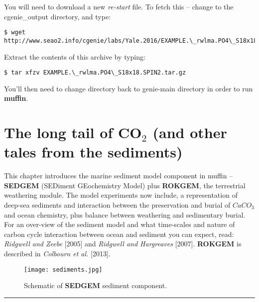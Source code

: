 \documentclass[11pt,fleqn]{book} %
\begin{document}
You will need to download a new \textit{re-start} file. To fetch this -- change to the \textsf{\footnotesize cgenie\_output directory}, and type:
\vspace{-1mm}\small\begin{verbatim}
$ wget http://www.seao2.info/cgenie/labs/Yale.2016/EXAMPLE.\_rwlma.PO4\_S18x18.SPIN2.tar.gz
\end{verbatim}\normalsize\vspace{-1mm}
\noindent Extract the contents of this archive by typing:
\vspace{-1mm}\small\begin{verbatim}
$ tar xfzv EXAMPLE.\_rwlma.PO4\_S18x18.SPIN2.tar.gz
\end{verbatim}\normalsize\vspace{-1mm}
You’ll then need to change directory back to \textsf{\footnotesize genie-main } directory in order to run \textbf{muffin}.


\newpage


\section{The long tail of CO$_{2}$ (and other tales from the sediments)}

This chapter introduces the marine sediment model component in muffin -- \textbf{SEDGEM} (SEDiment GEochemistry Model) plus \textbf{ROKGEM}, the terrestrial weathering module. The model experiments now include, a representation of deep-sea sediments and interaction between the preservation and burial of \(CaCO_{3}\) and ocean chemistry, plus balance between weathering and sedimentary burial. For an over-view of the sediment model and what time-scales and nature of carbon cycle interaction between ocean and sediment you can expect, read: \textit{Ridgwell and Zeebe} [2005] and \textit{Ridgwell and Hargreaves} [2007]. \textbf{ROKGEM} is described in \textit{Colbourn et al.} [2013].

\begin{figure}
\texttt{[image: sediments.jpg]}
\caption{Schematic of \textbf{SEDGEM} sediment component.}
\label{fig:sediments}
\end{figure}

\vspace{1mm}
\noindent\rule{4cm}{0.1mm}
\vspace{2mm}
\end{document}
